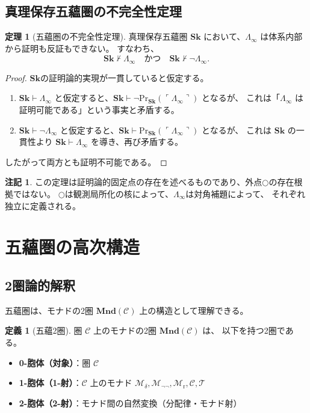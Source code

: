 \documentclass[11pt,a4paper]{ltjsarticle}
\theoremstyle{definition}
\newtheorem{definition}{定義}[section]
\newtheorem{theorem}{定理}[section]
\newtheorem{remark}{注記}[section]
\newcommand{\Sk}{\mathbf{Sk}}
\newcommand{\Mdelta}{\mathcal{M}_{\delta}}
\newcommand{\Mneg}{\mathcal{M}_{\neg\neg}}
\newcommand{\Mr}{\mathcal{M}_{\mathrm{r}}}
\newcommand{\Mc}{\mathcal{C}}
\newcommand{\T}{\mathcal{T}}
\newcommand{\PrSk}{\mathrm{Pr}_{\Sk}}
\newcommand{\LawvereInfinity}{\Lambda_\infty}
\begin{document}
\subsection{真理保存五蘊圏の不完全性定理}

\begin{theorem}[五蘊圏の不完全性定理]
真理保存五蘊圏 $\Sk$ において、$\LawvereInfinity$ は体系内部から証明も反証もできない。
すなわち、
\begin{equation}
\Sk \nvdash \LawvereInfinity \quad \text{かつ} \quad \Sk \nvdash \neg\LawvereInfinity.
\end{equation}
\end{theorem}
\begin{proof}
$\Sk$の証明論的実現が一貫していると仮定する。
\begin{enumerate}[label=(\roman*)]
\item $\Sk \vdash \LawvereInfinity$ と仮定すると、$\Sk \vdash \neg\PrSk(\ulcorner \LawvereInfinity \urcorner)$ となるが、
  これは「$\LawvereInfinity$ は証明可能である」という事実と矛盾する。
\item $\Sk \vdash \neg\LawvereInfinity$ と仮定すると、$\Sk \vdash \PrSk(\ulcorner \LawvereInfinity \urcorner)$ となるが、
  これは $\Sk$ の一貫性より $\Sk \vdash \LawvereInfinity$ を導き、再び矛盾する。
\end{enumerate}
したがって両方とも証明不可能である。
\end{proof}

\begin{remark}
この定理は証明論的固定点の存在を述べるものであり、外点$\bigcirc$の存在根拠ではない。
$\bigcirc$は観測局所化の核によって、$\LawvereInfinity$は対角補題によって、
それぞれ独立に定義される。
\end{remark}

\section{五蘊圏の高次構造}

\subsection{2圏論的解釈}

五蘊圏は、モナドの2圏 $\mathbf{Mnd}(\mathcal{C})$ 上の構造として理解できる。

\begin{definition}[五蘊2圏]
圏 $\mathcal{C}$ 上のモナドの2圏 $\mathbf{Mnd}(\mathcal{C})$ は、
以下を持つ2圏である。

\begin{itemize}
\item \textbf{0-胞体（対象）}：圏 $\mathcal{C}$
\item \textbf{1-胞体（1-射）}：$\mathcal{C}$ 上のモナド
  $\Mdelta, \Mneg, \Mr, \Mc, \T$
\item \textbf{2-胞体（2-射）}：モナド間の自然変換（分配律・モナド射）
\end{itemize}
\end{definition}
\end{document}

